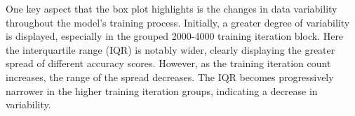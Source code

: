 One key aspect that the box plot highlights is the changes in data variability throughout the model's training process. Initially, a greater degree of variability is displayed, especially in the grouped 2000-4000 training iteration block. Here the interquartile range (IQR) is notably wider, clearly displaying the greater spread of different accuracy scores.  However, as the training iteration count increases, the range of the spread decreases. The IQR becomes progressively narrower in the higher training iteration groups, indicating a decrease in variability. \\



